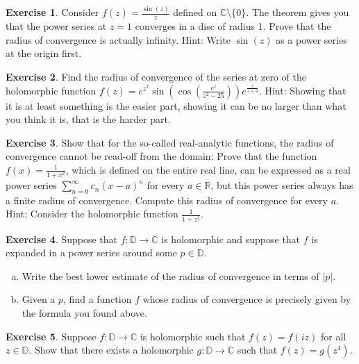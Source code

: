 \documentclass[12pt,openany]{book}
\newcommand{\sabs}[1]{\lvert {#1} \rvert}
\newcommand{\C}{{\mathbb{C}}}
\newcommand{\R}{{\mathbb{R}}}
\newcommand{\D}{{\mathbb{D}}}
\theoremstyle{plain}
\theoremstyle{remark}
\theoremstyle{definition}
\newenvironment{exbox}{%
    \def\FrameCommand{\vrule width 1pt \relax\hspace{10pt}}%
    \MakeFramed{\advance\hsize-\width\FrameRestore}%
}{%
    \endMakeFramed
}
\newenvironment{exparts}{%
    \leavevmode\begin{enumerate}[a),noitemsep,topsep=0pt,parsep=0pt,partopsep=0pt]
}{%
    \end{enumerate}
}
\theoremstyle{exercise}
\newtheorem{exercise}{Exercise}[section]
\theoremstyle{example}
\begin{document}
\begin{exbox}
\begin{exercise}
Consider $f(z) = \frac{\sin(z)}{z}$ defined on $\C \setminus \{ 0 \}$.
The theorem gives you that the power series at $z=1$ converges in a disc of
radius 1.  Prove that the radius of convergence is actually infinity.  Hint:
Write $\sin(z)$ as a power series at the origin first.
\end{exercise}

\begin{exercise}
Find the radius of convergence of the series at zero of the holomorphic
function $f(z) =
e^{z^7}\sin\left(\cos\left(\frac{e^z}{z^2-25}\right)\right)e^{\frac{z}{z+4}}$.
Hint: Showing that it is at least something is the easier part, showing it
can be no larger than what you think it is, that is the harder part.
\end{exercise}

\begin{exercise}\label{exercise:realradconvhard}
\pagebreak[2]
Show that for the so-called real-analytic functions, the radius of
convergence cannot be read-off from the domain:
Prove that the function $f(x) = \frac{1}{1+x^2}$,
which is defined on the
entire real line, can be expressed as a real power series
$\sum_{n=0}^\infty c_n {(x-a)}^n$ for every $a \in \R$, but
this power series always has a finite radius of convergence.
Compute this radius of convergence for every $a$.  Hint: Consider
the holomorphic function $\frac{1}{1+z^2}$.
\end{exercise}

\begin{exercise}
Suppose that $f \colon \D \to \C$ is holomorphic and suppose that
$f$ is expanded in a power series around some $p \in \D$.
\begin{exparts}
\item
Write the best lower estimate of the radius of convergence in terms of
$\sabs{p}$.
\item
Given a $p$, find a function $f$ whose radius of convergence is precisely
given by the formula you found above.
\end{exparts}
\end{exercise}

\begin{exercise}
Suppose $f \colon \D \to \C$ is holomorphic such that
$f(z) = f(iz)$ for all $z \in \D$.  Show that there
exists a holomorphic $g \colon \D \to \C$ such that
$f(z) = g(z^4)$.
\end{exercise}


\end{exbox}
\end{document}

